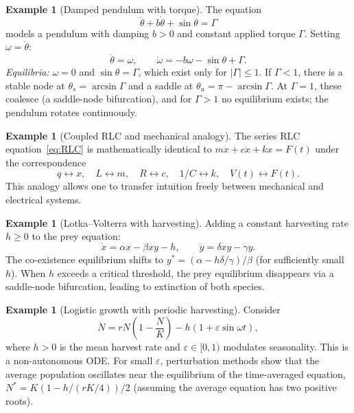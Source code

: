 \documentclass[12pt,a4paper,openany]{book}
\theoremstyle{definition}
\newtheorem{example}[definition]{Example}
\theoremstyle{plain}
\theoremstyle{remark}
\newcommand{\abs}[1]{\left|#1\right|}
\begin{document}
\begin{example}[Damped pendulum with torque]
\label{ex:damped-pendulum}
The equation
\[
  \ddot{\theta}+b\dot{\theta}+\sin\theta=\Gamma
\]
models a pendulum with damping $b>0$ and constant applied torque
$\Gamma$. Setting $\omega=\dot{\theta}$:
\[
  \dot{\theta}=\omega,\qquad
  \dot{\omega}=-b\omega-\sin\theta+\Gamma.
\]
\emph{Equilibria:} $\omega=0$ and $\sin\theta=\Gamma$, which exist
only for $\abs{\Gamma}\le 1$. If $\Gamma<1$, there is a stable node
at $\theta_{s}=\arcsin\Gamma$ and a saddle at
$\theta_{u}=\pi-\arcsin\Gamma$. At $\Gamma=1$, these coalesce (a
saddle-node bifurcation), and for $\Gamma>1$ no equilibrium exists;
the pendulum rotates continuously.
\end{example}

\begin{example}[Coupled RLC and mechanical analogy]
\label{ex:rlc-mechanical}
The series RLC equation~\eqref{eq:RLC} is mathematically identical to
$m\ddot{x}+c\dot{x}+kx=F(t)$ under the correspondence
\[
  q\leftrightarrow x,\quad L\leftrightarrow m,\quad
  R\leftrightarrow c,\quad 1/C\leftrightarrow k,\quad
  V(t)\leftrightarrow F(t).
\]
This analogy allows one to transfer intuition freely between
mechanical and electrical systems.
\end{example}

\begin{example}[Lotka--Volterra with harvesting]
\label{ex:lv-harvesting}
Adding a constant harvesting rate $h\ge 0$ to the prey equation:
\[
  \dot{x}=\alpha x-\beta xy - h,\qquad
  \dot{y}=\delta xy-\gamma y.
\]
The co-existence equilibrium shifts to
$y^{*}=(\alpha-h\delta/\gamma)/\beta$ (for sufficiently small $h$).
When $h$ exceeds a critical threshold, the prey equilibrium disappears
via a saddle-node bifurcation, leading to extinction of both species.
\end{example}

\begin{example}[Logistic growth with periodic harvesting]
\label{ex:logistic-periodic}
Consider
\[
  \dot{N} = rN\!\left(1-\frac{N}{K}\right) - h(1+\varepsilon\sin\omega t),
\]
where $h>0$ is the mean harvest rate and $\varepsilon\in[0,1)$
modulates seasonality. This is a non-autonomous ODE. For small
$\varepsilon$, perturbation methods show that the average population
oscillates near the equilibrium of the time-averaged equation,
$N^{*}=K(1-h/(rK/4))/2$ (assuming the average equation has two
positive roots).
\end{example}
\end{document}
